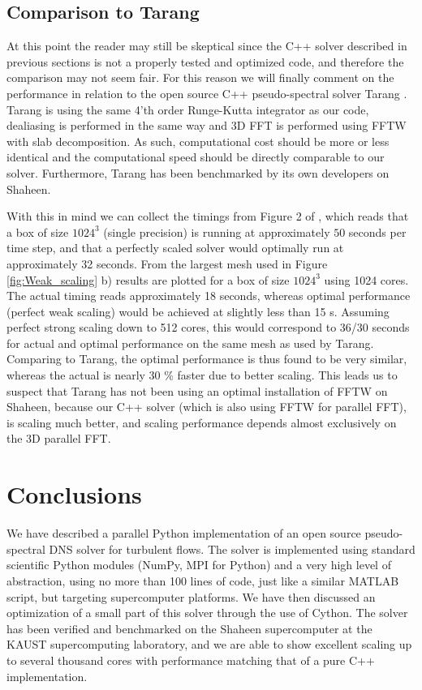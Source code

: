 \documentclass[final,3p,times,twocolumn]{elsarticle}
\begin{document}
\subsection{Comparison to Tarang}
At this point the reader may still be skeptical since the C++ solver described 
in previous sections  
is not a properly tested and optimized code, and therefore the comparison may  
not seem fair. For this reason we will finally comment on the performance in 
relation to 
the open source C++ pseudo-spectral solver Tarang \cite{tarang}. 
Tarang is 
using the same 4'th order Runge-Kutta integrator as our code, dealiasing is 
performed in the same way and 3D FFT is performed using FFTW with slab 
decomposition. As such, computational cost should be more or less identical and 
the computational speed should be directly comparable to our solver. 
Furthermore, Tarang  has been benchmarked by its own developers on Shaheen. 

With this 
in mind we can collect the timings from Figure 2 of \cite{tarang}, which reads 
that a box of size $1024^3$ (single precision) is running at approximately $50$ 
seconds per time step, and that a perfectly scaled solver would optimally run 
at approximately 32 seconds. From the 
largest mesh used in Figure \ref{fig:Weak_scaling} b) results are plotted for a 
box of size $1024^3$ using 1024 cores. The actual timing reads approximately 18 
seconds, whereas optimal performance 
(perfect weak scaling) would be achieved at slightly less than 15 s. Assuming 
perfect strong 
scaling down to 512 cores, this would correspond to 36/30 seconds for actual 
and optimal performance on the same mesh as used by Tarang. Comparing to 
Tarang, the optimal performance is thus found to be very similar, whereas
the actual is nearly 30 \% faster due to better scaling. This leads us to 
suspect that Tarang has not been using an optimal installation of FFTW on 
Shaheen, because our C++ solver (which is also using FFTW for parallel FFT), is 
scaling much better, and scaling performance depends almost exclusively on the 
3D parallel FFT.

\section{Conclusions}

We have described a parallel Python implementation of an open source 
pseudo-spectral DNS solver for turbulent flows. The solver is implemented using 
standard scientific Python modules (NumPy, MPI for Python) and a very high 
level of 
abstraction, using no more than 100 lines of code, just like a similar MATLAB 
script, but targeting supercomputer platforms. We have then discussed an 
optimization of a small part of this solver through the use of Cython. The 
solver has been verified and benchmarked on the Shaheen supercomputer at the 
KAUST supercomputing laboratory, and we are able to show excellent scaling up 
to several thousand cores with performance matching that of a pure C++ 
implementation.
\end{document}
